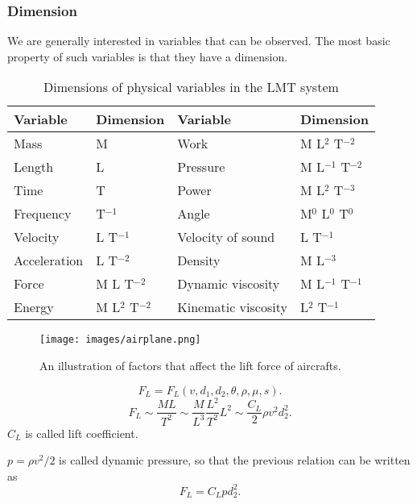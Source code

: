 \documentclass[xcolor=svgnames, t]{beamer}
\theoremstyle{definition}
\theoremstyle{plain}
\theoremstyle{remark}
\begin{document}
\begin{frame}[allowframebreaks]
	\frametitle{Dimension}
	We are generally interested in variables that can be observed. The most basic property of such variables is that they have a dimension.
	\begin{table}[htbp]
\centering
\caption{Dimensions of physical variables in the LMT system}
\label{tab:lmt_dimensions}
\begin{tabular}{|l|l||l|l|}
\hline
Variable & Dimension & Variable & Dimension \\
\hline
Mass & M & Work & M L$^2$ T$^{-2}$ \\
Length & L & Pressure & M L$^{-1}$ T$^{-2}$ \\
Time & T & Power & M L$^2$ T$^{-3}$ \\
Frequency & T$^{-1}$ & Angle & M$^0$ L$^0$ T$^0$ \\
Velocity & L T$^{-1}$ & Velocity of sound & L T$^{-1}$ \\
Acceleration & L T$^{-2}$ & Density & M L$^{-3}$ \\
Force & M L T$^{-2}$ & Dynamic viscosity & M L$^{-1}$ T$^{-1}$ \\
Energy & M L$^2$ T$^{-2}$ & Kinematic viscosity & L$^2$ T$^{-1}$ \\
\hline
\end{tabular}
\end{table}

\begin{figure}[]
	\centering
	\texttt{[image: images/airplane.png]}
	\caption{An illustration of factors that affect the lift force of aircrafts.}
	\label{fig:images-airplane-png}
\end{figure}
$$ F_L = F_L(v,d_1,d_2,\theta,\rho,\mu,s). $$ 
$$ F_L\sim \frac{ML}{T^2} \sim \frac{M}{L^3} \frac{L^2}{T^2} L^2 \sim \frac{C_L}{2}\rho v^2 d_2^2.$$ 
$C_L$ is called lift coefficient. \newpage

$ p =\rho v^2/2 $ is called dynamic pressure, so that the previous relation can be written as $$ F_L=C_L p d_2^2. $$  


\end{frame}
\end{document}
